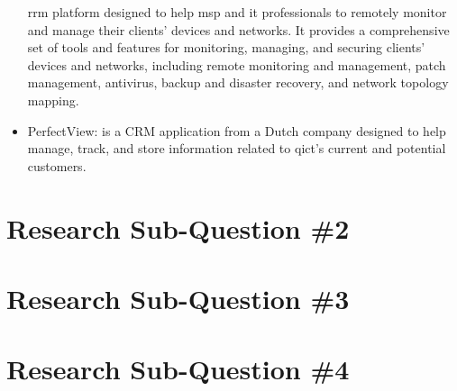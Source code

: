 \begin{multicols}{2}
\begin{itemize}
                  \acrshort{rrm} platform designed to help \acrshort{msp} and \acrshort{it} professionals to
                  remotely monitor and manage their clients' devices and networks. It provides a comprehensive
                  set of tools and features for monitoring, managing, and securing clients' devices and networks,
                  including remote monitoring and management, patch management, antivirus, backup and disaster
                  recovery, and network topology mapping.
            \item PerfectView: is a \gls{CRM} application from a Dutch company designed to help manage, track, and
                  store information related to \acrshort{qict}'s current and potential customers.
      \end{itemize}
      \section{Research Sub-Question \#2}
      \section{Research Sub-Question \#3}
      \section{Research Sub-Question \#4}
\end{multicols}